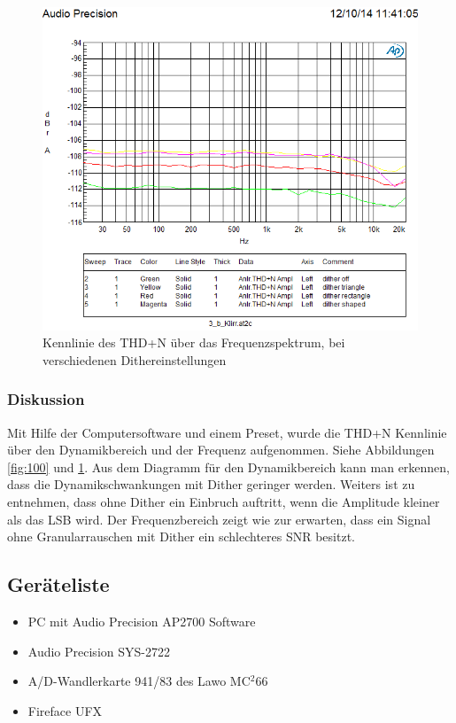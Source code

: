 \begin{figure}[h!]
\centering
\includegraphics[width=\columnwidth]{figures/Aufg2/3b1.PNG} 
\caption{Kennlinie des THD+N über das Frequenzspektrum, bei verschiedenen Dithereinstellungen}
\label{fig:1000}
\end{figure}
\clearpage
\subsubsection{Diskussion}
Mit Hilfe der Computersoftware und einem Preset, wurde die THD+N Kennlinie über den Dynamikbereich und der Frequenz aufgenommen. Siehe Abbildungen \ref{fig:100} und \ref{fig:1000}. Aus dem Diagramm für den Dynamikbereich kann man erkennen, dass die Dynamikschwankungen mit Dither geringer werden. Weiters ist zu entnehmen, dass ohne Dither ein Einbruch auftritt, wenn die Amplitude kleiner als das LSB wird.
Der Frequenzbereich zeigt wie zur erwarten, dass ein Signal ohne Granularrauschen mit Dither ein schlechteres SNR besitzt.


\subsection{Geräteliste}
\begin{itemize}
\item PC mit Audio Precision AP2700 Software
\item Audio Precision SYS-2722
\item A/D-Wandlerkarte 941/83 des Lawo MC$^2$66
\item Fireface UFX
\end{itemize}


